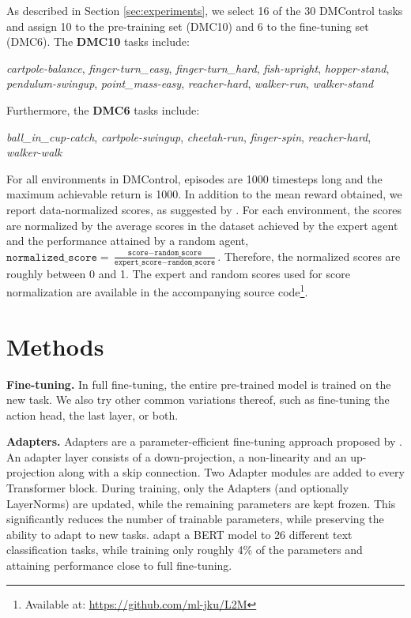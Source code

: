 As described in Section \ref{sec:experiments}, we select 16 of the 30 DMControl tasks and assign 10 to the pre-training set (DMC10) and 6 to the fine-tuning set (DMC6). 
The \textbf{DMC10} tasks include: 

\textit{cartpole-balance}, \textit{finger-turn\_easy}, \textit{finger-turn\_hard}, \textit{fish-upright}, \textit{hopper-stand}, \textit{pendulum-swingup}, \textit{point\_mass-easy}, \textit{reacher-hard}, \textit{walker-run}, \textit{walker-stand}

Furthermore, the \textbf{DMC6} tasks include: 

\textit{ball\_in\_cup-catch}, \textit{cartpole-swingup}, \textit{cheetah-run}, \textit{finger-spin}, \textit{reacher-hard}, \textit{walker-walk}

For all environments in DMControl, episodes are 1000 timesteps long and the maximum achievable return is 1000. In addition to the mean reward obtained, we report data-normalized scores, as suggested by \citet{Fu:20}. For each environment, the scores are normalized by the average scores in the dataset achieved by the expert agent and the performance attained by a random agent, $\texttt{normalized\_score} = \frac{\texttt{score} - \texttt{random\_score}}{\texttt{expert\_score} - \texttt{random\_score}}$. Therefore, the normalized scores are roughly between 0 and 1. The expert and random scores used for score normalization are available in the accompanying source code\footnote{Available at: \url{https://github.com/ml-jku/L2M}}. 

    


\section{Methods}\label{appendix:methods}

\textbf{Fine-tuning.} In full fine-tuning, the entire pre-trained model is trained on the new task. We also try other common variations thereof, such as fine-tuning the action head, the last layer, or both.

\textbf{Adapters.} Adapters are a parameter-efficient fine-tuning approach proposed by \citet{Houlsby:19}. An adapter layer consists of a down-projection, a non-linearity and an up-projection along with a skip connection. Two Adapter modules are added to every Transformer block. During training, only the Adapters (and optionally LayerNorms) are updated, while the remaining parameters are kept frozen. This significantly reduces the number of trainable parameters, while preserving the ability to adapt to new tasks. \citet{Houlsby:19} adapt a BERT \citep{Devlin:18}  model to 26 different text classification tasks, while training only roughly 4\% of the parameters and attaining performance close to full fine-tuning. 

